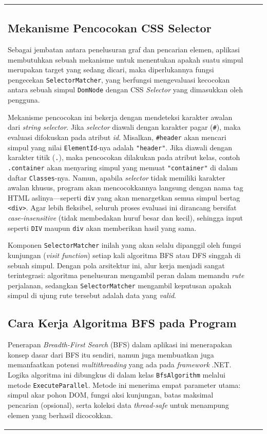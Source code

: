 \documentclass[12pt]{article}
\begin{document}
\begin{table}[H]
\begin{tabular}{|l|c|c|}
\begin{document}
\subsection{Mekanisme Pencocokan CSS Selector}

Sebagai jembatan antara penelusuran graf dan pencarian elemen, aplikasi membutuhkan sebuah mekanisme untuk menentukan apakah suatu simpul merupakan target yang sedang dicari, maka diperlukannya fungsi pengecekan \texttt{SelectorMatcher}, yang berfungsi mengevaluasi kecocokan antara sebuah simpul \texttt{DomNode} dengan CSS \textit{Selector} yang dimasukkan oleh pengguna.

Mekanisme pencocokan ini bekerja dengan mendeteksi karakter awalan dari \textit{string selector}. Jika \textit{selector} diawali dengan karakter pagar (\verb|#|), maka evaluasi difokuskan pada atribut \textit{id}.  Misalkan, \verb|#header| akan mencari simpul yang nilai \texttt{ElementId}-nya adalah \texttt{"header"}. Jika diawali dengan karakter titik (\verb|.|), maka pencocokan dilakukan pada atribut kelas, contoh \verb|.container| akan menyaring simpul yang memuat \texttt{"container"} di dalam daftar \texttt{Classes}-nya. Namun, apabila \textit{selector} tidak memiliki karakter awalan khusus, program akan mencocokkannya langsung dengan nama tag HTML aslinya---seperti \verb|div| yang akan menargetkan semua simpul bertag \verb|<div>|. Agar lebih fleksibel, seluruh proses evaluasi ini dirancang bersifat \textit{case-insensitive} (tidak membedakan huruf besar dan kecil), sehingga input seperti \verb|DIV| maupun \verb|div| akan memberikan hasil yang sama.

Komponen \texttt{SelectorMatcher} inilah yang akan selalu dipanggil oleh fungsi kunjungan (\textit{visit function}) setiap kali algoritma BFS atau DFS singgah di sebuah simpul. Dengan pola arsitektur ini, alur kerja menjadi sangat terintegrasi: algoritma penelusuran mengambil peran dalam memandu \textit{rute} perjalanan, sedangkan \texttt{SelectorMatcher} mengambil keputusan apakah simpul di ujung rute tersebut adalah data yang \textit{valid}.

\subsection{Cara Kerja Algoritma BFS pada Program}

Penerapan \textit{Breadth-First Search} (BFS) dalam aplikasi ini menerapakan konsep dasar dari BFS itu sendiri, namun juga membuatkan juga memanfaatkan potensi \textit{multithreading} yang ada pada \textit{framework} .NET. Logika algoritma ini dibungkus di dalam kelas \texttt{BfsAlgorithm} melalui metode \texttt{ExecuteParallel}. Metode ini menerima empat parameter utama: simpul akar pohon DOM, fungsi aksi kunjungan, batas maksimal pencarian (opsional), serta koleksi data \textit{thread-safe} untuk menampung elemen yang berhasil dicocokkan.


\end{document}
\end{tabular}
\end{table}
\end{document}
